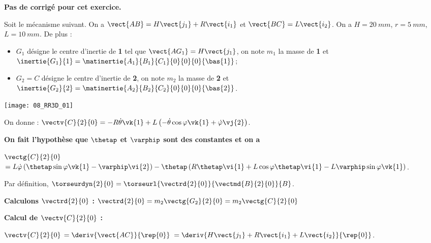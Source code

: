 \normalfalse \difficiletrue \tdifficilefalse
\correctionfalse


\setcounter{question}{0}
\ifcorrection
\else
\textbf{Pas de corrigé pour cet exercice.}
\fi

\ifprof
\else
Soit le mécanisme suivant. On a $\vect{AB}=H\vect{j_1}+R\vect{i_1}$ et $\vect{BC}=L\vect{i_2}$. On a $H=\SI{20}{mm}$, $r=\SI{5}{mm}$, $L=\SI{10}{mm}$. De plus :
\begin{itemize}
\item $G_1$ désigne le centre d'inertie de \textbf{1} tel que $\vect{AG_1}=H\vect{j_1}$, on note $m_1$ la masse de \textbf{1} et $\inertie{G_1}{1}=\matinertie{A_1}{B_1}{C_1}{0}{0}{0}{\bas{1}}$; 
\item $G_2=C$ désigne le centre d'inertie de \textbf{2}, on note $m_2$ la masse de \textbf{2} et $\inertie{G_2}{2}=\matinertie{A_2}{B_2}{C_2}{0}{0}{0}{\bas{2}}$.
\end{itemize}
\begin{center}
\texttt{[image: 08\_RR3D\_01]}
\end{center}

\ifcolle
\else
On donne : 
$\vectv{C}{2}{0} = -R\dot{\theta}\vk{1}+L\left(-\dot{\theta}\cos\varphi\vk{1} + \dot{\varphi}\vj{2}\right)$.

\textbf{On fait l'hypothèse que $\thetap$ et $\varphip$ sont des constantes et on a }

$\vectg{C}{2}{0} $
$ =L\dot{\varphi}\left(\thetap\sin\varphi\vk{1}-\varphip\vi{2}\right)
-\thetap\left( R \thetap\vi{1} +L\cos\varphi \thetap\vi{1}
-L\varphip\sin\varphi\vk{1}\right)
$.
\fi


\fi

\ifprof


Par définition, $\torseurdyn{2}{0} = \torseurl{\vectrd{2}{0}}{\vectmd{B}{2}{0}}{B}$.

\textbf{Calculons $\vectrd{2}{0}$ : } 
$\vectrd{2}{0} = m_2\vectg{G_2}{2}{0}=m_2 \vectg{C}{2}{0} $

\textbf{Calcul de $\vectv{C}{2}{0}$ : }  

$\vectv{C}{2}{0}$ 
$=\deriv{\vect{AC}}{\rep{0}}$
$=\deriv{H\vect{j_1}+R\vect{i_1}+L\vect{i_2}}{\rep{0}}$.

